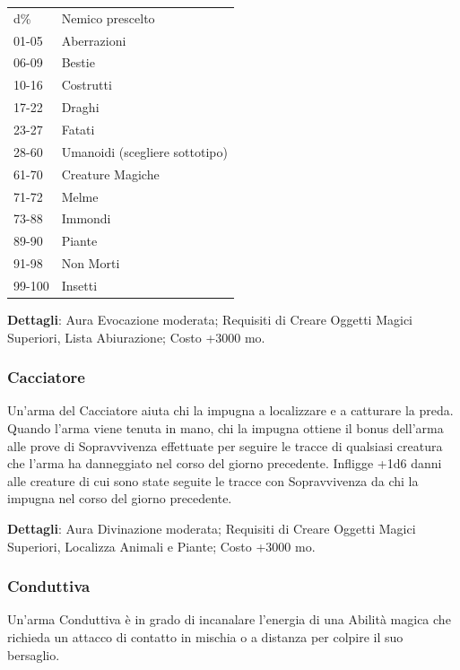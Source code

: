 \begin{multicols}{2}
\medskip

\begin{tabular}{ll}
d\% &Nemico prescelto\\
01-05 &Aberrazioni\\
06-09 &Bestie\\
10-16 &Costrutti\\
17-22 &Draghi\\
23-27 &Fatati\\
28-60 &Umanoidi (scegliere sottotipo)\\
61-70 &Creature Magiche\\
71-72 &Melme\\
73-88 &Immondi\\
89-90 &Piante\\
91-98 &Non Morti\\
99-100 &Insetti\\
\end{tabular}

\medskip

\textbf{Dettagli}: Aura Evocazione moderata; Requisiti di Creare Oggetti Magici Superiori, Lista Abiurazione; Costo +3000 mo.

\subsubsection*{Cacciatore}

Un'arma del Cacciatore aiuta chi la impugna a localizzare e a catturare la preda. Quando l'arma viene tenuta in mano, chi la impugna ottiene il bonus dell'arma alle prove di Sopravvivenza effettuate per seguire le tracce di qualsiasi creatura che l'arma ha danneggiato nel corso del giorno precedente. Infligge +1d6 danni alle creature di cui sono state seguite le tracce con Sopravvivenza da chi la impugna nel corso del giorno precedente.

\textbf{Dettagli}: Aura Divinazione moderata; Requisiti di Creare Oggetti Magici Superiori, Localizza Animali e Piante; Costo +3000 mo.

\subsubsection*{Conduttiva}

Un'arma Conduttiva è in grado di incanalare l'energia di una Abilità magica che richieda un attacco di contatto in mischia o a distanza per colpire il suo bersaglio.


\end{multicols}
